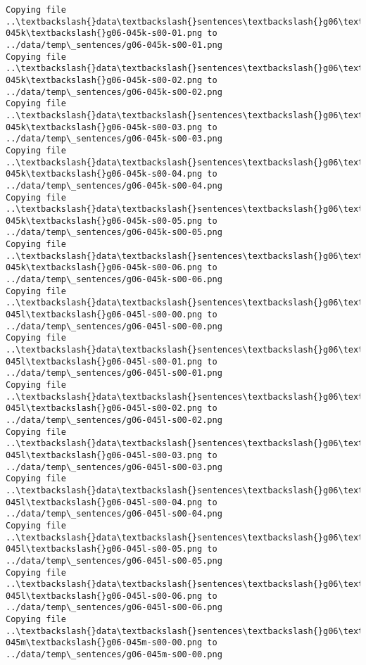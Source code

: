 \documentclass[11pt]{article}
\begin{document}
\begin{Verbatim}[commandchars=\\\{\}]
Copying file ..\textbackslash{}data\textbackslash{}sentences\textbackslash{}g06\textbackslash{}g06-045k\textbackslash{}g06-045k-s00-01.png to
../data/temp\_sentences/g06-045k-s00-01.png
Copying file ..\textbackslash{}data\textbackslash{}sentences\textbackslash{}g06\textbackslash{}g06-045k\textbackslash{}g06-045k-s00-02.png to
../data/temp\_sentences/g06-045k-s00-02.png
Copying file ..\textbackslash{}data\textbackslash{}sentences\textbackslash{}g06\textbackslash{}g06-045k\textbackslash{}g06-045k-s00-03.png to
../data/temp\_sentences/g06-045k-s00-03.png
Copying file ..\textbackslash{}data\textbackslash{}sentences\textbackslash{}g06\textbackslash{}g06-045k\textbackslash{}g06-045k-s00-04.png to
../data/temp\_sentences/g06-045k-s00-04.png
Copying file ..\textbackslash{}data\textbackslash{}sentences\textbackslash{}g06\textbackslash{}g06-045k\textbackslash{}g06-045k-s00-05.png to
../data/temp\_sentences/g06-045k-s00-05.png
Copying file ..\textbackslash{}data\textbackslash{}sentences\textbackslash{}g06\textbackslash{}g06-045k\textbackslash{}g06-045k-s00-06.png to
../data/temp\_sentences/g06-045k-s00-06.png
Copying file ..\textbackslash{}data\textbackslash{}sentences\textbackslash{}g06\textbackslash{}g06-045l\textbackslash{}g06-045l-s00-00.png to
../data/temp\_sentences/g06-045l-s00-00.png
Copying file ..\textbackslash{}data\textbackslash{}sentences\textbackslash{}g06\textbackslash{}g06-045l\textbackslash{}g06-045l-s00-01.png to
../data/temp\_sentences/g06-045l-s00-01.png
Copying file ..\textbackslash{}data\textbackslash{}sentences\textbackslash{}g06\textbackslash{}g06-045l\textbackslash{}g06-045l-s00-02.png to
../data/temp\_sentences/g06-045l-s00-02.png
Copying file ..\textbackslash{}data\textbackslash{}sentences\textbackslash{}g06\textbackslash{}g06-045l\textbackslash{}g06-045l-s00-03.png to
../data/temp\_sentences/g06-045l-s00-03.png
Copying file ..\textbackslash{}data\textbackslash{}sentences\textbackslash{}g06\textbackslash{}g06-045l\textbackslash{}g06-045l-s00-04.png to
../data/temp\_sentences/g06-045l-s00-04.png
Copying file ..\textbackslash{}data\textbackslash{}sentences\textbackslash{}g06\textbackslash{}g06-045l\textbackslash{}g06-045l-s00-05.png to
../data/temp\_sentences/g06-045l-s00-05.png
Copying file ..\textbackslash{}data\textbackslash{}sentences\textbackslash{}g06\textbackslash{}g06-045l\textbackslash{}g06-045l-s00-06.png to
../data/temp\_sentences/g06-045l-s00-06.png
Copying file ..\textbackslash{}data\textbackslash{}sentences\textbackslash{}g06\textbackslash{}g06-045m\textbackslash{}g06-045m-s00-00.png to
../data/temp\_sentences/g06-045m-s00-00.png

\end{Verbatim}
\end{document}
